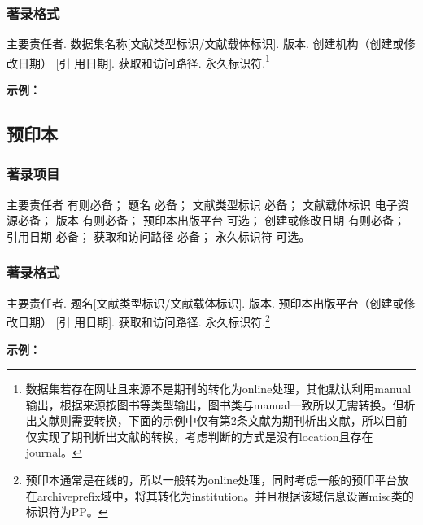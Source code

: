 \documentclass{article}
\begin{document}
\subsubsection{著录格式}
主要责任者. 数据集名称[文献类型标识/文献载体标识]. 版本. 创建机构（创建或修改日期） [引
用日期]. 获取和访问路径. 永久标识符.\footnote{数据集若存在网址且来源不是期刊的转化为online处理，其他默认利用manual输出，根据来源按图书等类型输出，图书类与manual一致所以无需转换。但析出文献则需要转换，下面的示例中仅有第2条文献为期刊析出文献，所以目前仅实现了期刊析出文献的转换，考虑判断的方式是没有location且存在journal。}

\begin{refsection}

\nocite{草地数据1994--,李皓2024语料库,彭守璋2024降水,刘时银2012水川,仲晓雅2022夜间灯光,仲晓雅2022夜间灯光en,IHME2021Disease,郑涵2018生态}


\textbf{示例：}

{\printbibliography[heading=none,env=indentegenv]}

\end{refsection}


\subsection{预印本}


\subsubsection{著录项目}

主要责任者 有则必备；
题名 必备；
文献类型标识 必备；
文献载体标识 电子资源必备；
版本 有则必备；
预印本出版平台 可选；
创建或修改日期 有则必备；
引用日期 必备；
获取和访问路径 必备；
永久标识符 可选。

\subsubsection{著录格式}

主要责任者. 题名[文献类型标识/文献载体标识]. 版本. 预印本出版平台（创建或修改日期） [引
用日期]. 获取和访问路径. 永久标识符.\footnote{预印本通常是在线的，所以一般转为online处理，同时考虑一般的预印平台放在archiveprefix域中，将其转化为institution。并且根据该域信息设置misc类的标识符为PP。}

\begin{refsection}
\nocite{方向明2023元宇宙,肖玲2024数据,山东一医大2025,BLOSS2025trial,JENKINS2012light}


\textbf{示例：}

{\printbibliography[heading=none,env=indentegenv]}

\end{refsection}
\end{document}
